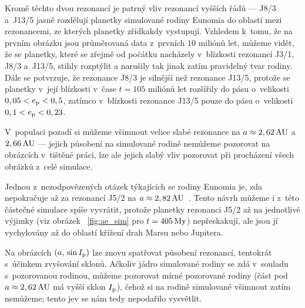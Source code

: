 \documentclass[A4paper, 12pt, oneside]{book}
\begin{document}
Kromě těchto dvou rezonancí je patrný vliv rezonancí vyšších řádů --- J8/3 a~J13/5 jasně rozdělují planetky simulované rodiny Eunomia do oblastí mezi rezonancemi, ze kterých planetky zřídkakdy vystupují. Vzhledem k~tomu, že na prvním obrázku jsou průměrovaná data z~prvních $10$ miliónů let, můžeme vidět, že se planetky, které se zřejmě od počátku nacházely v~blízkosti rezonancí J3/1, J8/3 a~J13/5, stihly rozptýlit a narušily tak jinak zatím pravidelný tvar rodiny. Dále se potvrzuje, že rezonance J8/3 je silnější než rezonance J13/5, protože se planetky v~její blízkosti v~čase $t=105$ miliónů let rozšířily do pásu o~velikosti $0,05<e_{\rm p}<0,5$, zatímco v~blízkosti rezonance J13/5 pouze do pásu o~velikosti $0,1<e_{\rm p}<0,23$.

V~populaci pozadí si můžeme všimnout velice slabé rezonance na $a\approx2,62\,{\rm AU}$ a~$2,66\,{\rm AU}$ --- jejich působení na simulované rodině nemůžeme pozorovat na obrázcích v~tištěné práci, lze ale jejich slabý vliv pozorovat při procházení všech obrázků z~celé simulace.

Jednou z~nezodpovězených otázek týkajících se rodiny Eunomia je, zda nepokračuje až za rezonancí J5/2 na $a\approx2,82\,{\rm AU}$~\cite{nesvorny15}. Tento návrh můžeme i z~této částečné simulace spíše vyvrátit, protože planetky rezonanci J5/2 až na jednotlivé výjimky (viz obrázek ~\ref{fig:ae_sim} pro $t=405\,{\rm My}$) nepřeskakují, ale jsou jí vychylovány až do oblastí křížení drah Marsu nebo Jupitera.

Na obrázcích $(a,\,\sin I_{\rm p})$ lze znovu spatřovat působení rezonancí, tentokrát s~účinkem zvyšování sklonů. Ačkoliv jádro simulované rodiny se zdá v~souladu s~pozorovanou rodinou, můžeme pozorovat mírné  pozorované rodiny (část pod $a\approx2,62\,{\rm AU}$ má vyšší sklon $I_{\rm p}$), čehož si na rodině simulované všimnout zatím nemůžeme; tento jev se nám tedy nepodařilo vysvětlit.
\end{document}
